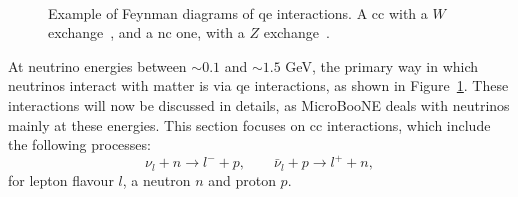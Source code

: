 \begin{figure}[h]
\centering
{} \qquad\qquad \qquad
    \\
\caption[Feynman Diagrams for Quasi-Elastic Scattering]{Example of Feynman diagrams of \acrshort{qe} interactions. A \acrshort{cc} with a $W$ exchange~\protect{}, and a \acrshort{nc} one, with a $Z$ exchange~\protect{}.}
\label{fig:diagramWZ}
\end{figure}

At neutrino energies between $\sim0.1$ and $\sim1.5$ GeV, the primary way in which neutrinos interact with matter is via \acrshort{qe} interactions, as shown in Figure~\ref{fig:diagramWZ}. These interactions will now be discussed in details, as MicroBooNE deals with neutrinos mainly at these energies.
This section focuses on \acrshort{cc} interactions, which include the following processes: 
\begin{equation}
\nu_l + n \rightarrow l^- + p, \qquad \bar{\nu}_l + p \rightarrow l^+ + n,
\end{equation} 
for lepton flavour $l$, a neutron $n$ and proton $p$.


%

